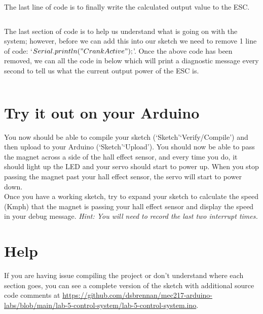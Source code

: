 \documentclass[11pt,a4paper]{article}
\begin{document}
\noindent
The last line of code is to finally write the calculated output value to the ESC.\\
\vspace{-1.75em}
\inputminted{arduino}{./src/5-esc-power.txt}
\vspace{.75em}

\noindent
The last section of code is to help us understand what is going on with the system; however, before we can add this into our sketch we need to remove 1 line of code: `$Serial.println("Crank Active");$'. Once the above code has been removed, we can all the code in below which will print a diagnostic message every second to tell us what the current output power of the ESC is.\\
\vspace{-1.75em}
\inputminted{arduino}{./src/6-message.txt}
\vspace{-1em}

\section*{Try it out on your Arduino}
You now should be able to compile your sketch (`Sketch'\textrightarrow `Verify/Compile') and then upload to your Arduino (`Sketch'\textrightarrow `Upload'). You should now be able to pass the magnet across a side of the hall effect sensor, and every time you do, it should light up the LED and your servo should start to power up. When you stop passing the magnet past your hall effect sensor, the servo will start to power down.\\

\noindent
Once you have a working sketch, try to expand your sketch to calculate the speed (Kmph) that the magnet is passing your hall effect sensor and display the speed in your debug message. \textit{Hint: You will need to record the last two interrupt times.}

\section*{Help}
If you are having issue compiling the project or don't understand where each section goes, you can see a complete version of the sketch with additional source code comments at \url{https://github.com/dsbrennan/mec217-arduino-labs/blob/main/lab-5-control-system/lab-5-control-system.ino}.

\begin{center}
\end{center}
\end{document}
